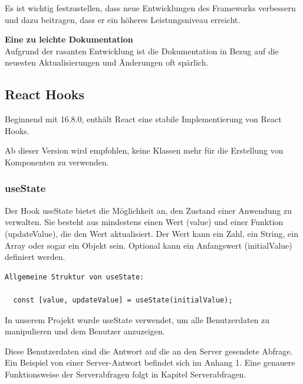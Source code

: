 Es ist wichtig festzustellen, dass neue Entwicklungen des Frameworks verbessern und dazu beitragen, dass er ein höheres Leistungsniveau erreicht.
\newline

\textbf{Eine zu leichte Dokumentation}\\
Aufgrund der rasanten Entwicklung ist die Dokumentation in Bezug auf die neuesten Aktualisierungen und Änderungen oft spärlich.{\cite{R01}}

\subsection{React Hooks}

Beginnend mit 16.8.0, enthält React eine stabile Implementierung von React Hooks.

Ab dieser Version wird empfohlen, keine Klassen mehr für die Erstellung von Komponenten zu verwenden.

\subsubsection{useState}
Der Hook useState bietet die Möglichkeit an, den Zustand einer Anwendung zu verwalten. Sie besteht aus mindestens einen Wert (value) und einer Funktion (updateValue), die den Wert aktualisiert.
Der Wert kann ein Zahl, ein String, ein Array oder sogar ein Objekt sein.
Optional kann ein Anfangswert (initialValue) definiert werden.
\begin{lstlisting}
Allgemeine Struktur von useState:

  const [value, updateValue] = useState(initialValue);  
\end{lstlisting}

In unserem Projekt wurde useState verwendet, um alle Benutzerdaten zu manipulieren und dem Benutzer anzuzeigen.

Diese Benutzerdaten sind die Antwort auf die an den Server gesendete Abfrage.
Ein Beispiel von einer Server-Antwort befindet sich im Anhang 1.
Eine genauere Funktionsweise der Serverabfragen folgt in Kapitel Serverabfragen.
\\

